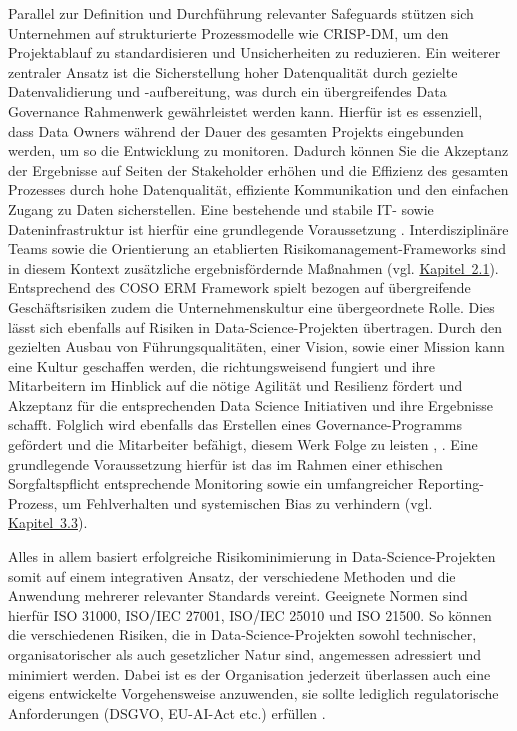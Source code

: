 Parallel zur Definition und Durchführung relevanter Safeguards stützen sich Unternehmen auf strukturierte Prozessmodelle wie CRISP-DM, um den Projektablauf zu standardisieren und Unsicherheiten zu reduzieren. 
Ein weiterer zentraler Ansatz ist die Sicherstellung hoher Datenqualität durch gezielte Datenvalidierung und -aufbereitung, was durch ein übergreifendes Data Governance Rahmenwerk gewährleistet werden kann. Hierfür ist es essenziell,
dass Data Owners während der Dauer des gesamten Projekts eingebunden werden, um so die Entwicklung zu monitoren. Dadurch können Sie die Akzeptanz der Ergebnisse auf Seiten der Stakeholder erhöhen und die Effizienz des gesamten Prozesses
 durch hohe Datenqualität, effiziente Kommunikation und den einfachen Zugang zu Daten sicherstellen. Eine bestehende und stabile IT- sowie Dateninfrastruktur ist hierfür eine grundlegende Voraussetzung \cite{Borus_2020}. Interdisziplinäre 
 Teams sowie die Orientierung an etablierten Risikomanagement-Frameworks sind in diesem Kontext zusätzliche ergebnisfördernde Maßnahmen (vgl. \hyperref[sec:begriffe]{Kapitel~2.1}).
Entsprechend des COSO ERM Framework spielt bezogen auf übergreifende Geschäftsrisiken zudem die Unternehmenskultur eine übergeordnete Rolle. Dies lässt sich ebenfalls auf Risiken in Data-Science-Projekten übertragen.
 Durch den gezielten Ausbau von Führungsqualitäten, einer Vision, sowie einer Mission kann eine Kultur geschaffen werden, die richtungsweisend fungiert und ihre Mitarbeitern im Hinblick auf die nötige Agilität und Resilienz fördert und Akzeptanz für die entsprechenden
  Data Science Initiativen und ihre Ergebnisse schafft. Folglich wird ebenfalls das Erstellen eines Governance-Programms gefördert und die Mitarbeiter befähigt, diesem Werk Folge zu leisten \cite{COSO_2020}, \cite{Kotter_2011}. Eine grundlegende Voraussetzung hierfür ist das im Rahmen einer ethischen Sorgfaltspflicht entsprechende Monitoring sowie ein umfangreicher Reporting-Prozess, um Fehlverhalten und systemischen Bias zu verhindern \cite{Kersten_27001_2019} (vgl. \hyperref[sec:risiko_monitoring]{Kapitel~3.3}).

Alles in allem basiert erfolgreiche Risikominimierung in Data-Science-Projekten somit auf einem integrativen Ansatz, der verschiedene Methoden und die Anwendung mehrerer relevanter Standards vereint. Geeignete Normen sind hierfür ISO 31000, ISO/IEC 27001, ISO/IEC 25010 und ISO 21500. So können die verschiedenen Risiken, die in Data-Science-Projekten sowohl technischer, organisatorischer als auch gesetzlicher Natur sind, angemessen adressiert und minimiert werden. Dabei ist es der Organisation jederzeit überlassen auch eine eigens entwickelte Vorgehensweise anzuwenden, sie sollte lediglich regulatorische Anforderungen (DSGVO, EU-AI-Act etc.) erfüllen \cite{EUAIAct2024}.